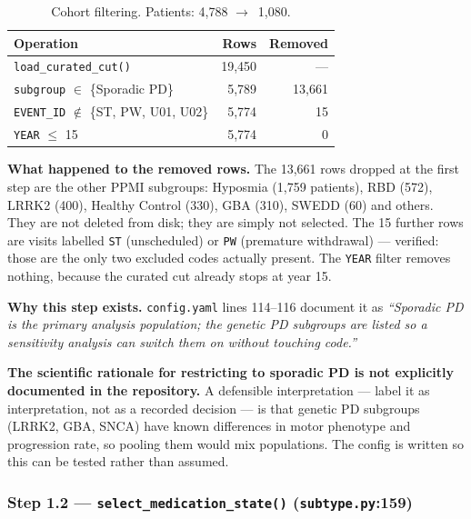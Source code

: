 \documentclass[11pt,a4paper]{article}
\newcommand{\code}[1]{\texttt{\small #1}}
\newcommand{\arr}{$\rightarrow$}
\begin{document}
\begin{table}[h]
\centering
\begin{tabular}{@{}lrr@{}}
\toprule
\textbf{Operation} & \textbf{Rows} & \textbf{Removed} \\
\midrule
\code{load\_curated\_cut()}                          & 19{,}450 & --- \\
\code{subgroup} $\in$ \{Sporadic PD\}                & \phantom{0}5{,}789 & 13{,}661 \\
\code{EVENT\_ID} $\notin$ \{ST, PW, U01, U02\}       & \phantom{0}5{,}774 & \phantom{00,0}15 \\
\code{YEAR} $\leq$ 15                                & \phantom{0}5{,}774 & \phantom{00,00}0 \\
\bottomrule
\end{tabular}
\caption{Cohort filtering. Patients: 4{,}788 \arr\ 1{,}080.}
\end{table}

\noindent
\textbf{What happened to the removed rows.} The 13{,}661 rows dropped at the
first step are the other PPMI subgroups: Hyposmia (1{,}759 patients), RBD
(572), LRRK2 (400), Healthy Control (330), GBA (310), SWEDD (60) and others.
They are not deleted from disk; they are simply not selected. The 15 further
rows are visits labelled \code{ST} (unscheduled) or \code{PW} (premature
withdrawal) --- verified: those are the only two excluded codes actually
present. The \code{YEAR} filter removes nothing, because the curated cut
already stops at year 15.

\textbf{Why this step exists.} \code{config.yaml} lines 114--116 document it as
\emph{``Sporadic PD is the primary analysis population; the genetic PD subgroups
are listed so a sensitivity analysis can switch them on without touching
code.''}

\textbf{The scientific rationale for restricting to sporadic PD is not
explicitly documented in the repository.} A defensible interpretation --- label
it as interpretation, not as a recorded decision --- is that genetic PD
subgroups (LRRK2, GBA, SNCA) have known differences in motor phenotype and
progression rate, so pooling them would mix populations. The config is written
so this can be tested rather than assumed.

\subsubsection*{Step 1.2 --- \code{select\_medication\_state()} \quad (\code{subtype.py}:159)}
\end{document}
